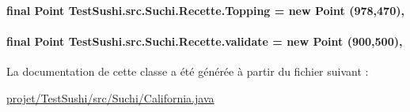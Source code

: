 \paragraph[{Topping}]{\setlength{\rightskip}{0pt plus 5cm}final Point Test\+Sushi.\+src.\+Suchi.\+Recette.\+Topping = new Point (978,470)\hspace{0.3cm}{\ttfamily [protected]}, {\ttfamily [inherited]}}\label{classTestSushi_1_1src_1_1Suchi_1_1Recette_ab7575f64998864f6b053859c18380f58}
\hypertarget{classTestSushi_1_1src_1_1Suchi_1_1Recette_a9c491e7f09a444817e433e54923e6bca}{}
\paragraph[{validate}]{\setlength{\rightskip}{0pt plus 5cm}final Point Test\+Sushi.\+src.\+Suchi.\+Recette.\+validate = new Point (900,500)\hspace{0.3cm}{\ttfamily [protected]}, {\ttfamily [inherited]}}\label{classTestSushi_1_1src_1_1Suchi_1_1Recette_a9c491e7f09a444817e433e54923e6bca}


La documentation de cette classe a été générée à partir du fichier suivant \+:\begin{DoxyCompactItemize}
\item 
\hyperlink{projet_2TestSushi_2src_2Suchi_2California_8java}{projet/\+Test\+Sushi/src/\+Suchi/\+California.\+java}\end{DoxyCompactItemize}
